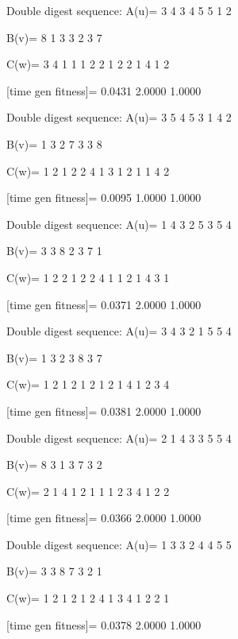Double digest sequence:
A(u)=
     3     4     3     4     5     5     1     2

B(v)=
     8     1     3     3     2     3     7

C(w)=
     3     4     1     1     1     2     2     1     2     2     1     4     1     2

[time gen fitness]=
    0.0431    2.0000    1.0000

Double digest sequence:
A(u)=
     3     5     4     5     3     1     4     2

B(v)=
     1     3     2     7     3     3     8

C(w)=
     1     2     1     2     2     4     1     3     1     2     1     1     4     2

[time gen fitness]=
    0.0095    1.0000    1.0000

Double digest sequence:
A(u)=
     1     4     3     2     5     3     5     4

B(v)=
     3     3     8     2     3     7     1

C(w)=
     1     2     2     1     2     2     4     1     1     2     1     4     3     1

[time gen fitness]=
    0.0371    2.0000    1.0000

Double digest sequence:
A(u)=
     3     4     3     2     1     5     5     4

B(v)=
     1     3     2     3     8     3     7

C(w)=
     1     2     1     2     1     2     1     2     1     4     1     2     3     4

[time gen fitness]=
    0.0381    2.0000    1.0000

Double digest sequence:
A(u)=
     2     1     4     3     3     5     5     4

B(v)=
     8     3     1     3     7     3     2

C(w)=
     2     1     4     1     2     1     1     1     2     3     4     1     2     2

[time gen fitness]=
    0.0366    2.0000    1.0000

Double digest sequence:
A(u)=
     1     3     3     2     4     4     5     5

B(v)=
     3     3     8     7     3     2     1

C(w)=
     1     2     1     2     1     2     4     1     3     4     1     2     2     1

[time gen fitness]=
    0.0378    2.0000    1.0000

